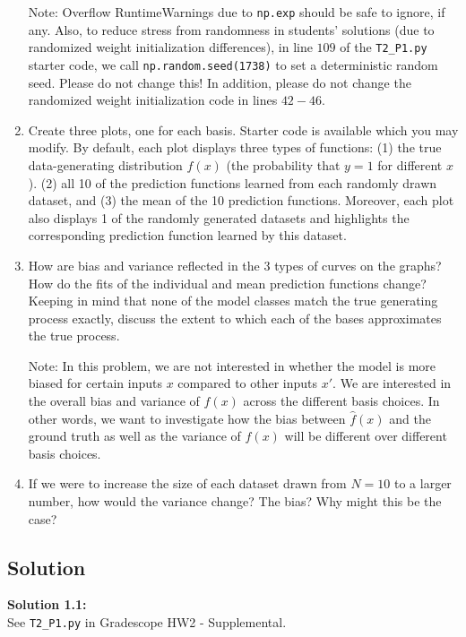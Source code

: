 \documentclass[submit]{harvardml}
\begin{document}
\begin{problem}
\begin{enumerate}
   Note: Overflow RuntimeWarnings due to \verb|np.exp| should be safe to ignore, if any. Also, to reduce stress from randomness in students' solutions (due to randomized weight initialization differences), in line $109$ of the \verb|T2_P1.py| starter code, we call \verb|np.random.seed(1738)| to set a deterministic random seed. Please do not change this! In addition, please do not change the randomized weight initialization code in lines $42-46$.

\item Create three plots, one for each basis. Starter code is available which you may modify.
By default, each plot displays three types of functions:
(1) the true data-generating distribution $f(x)$ (the probability that $y=1$ for different $x$).
(2) all 10 of the prediction functions learned from each randomly drawn dataset, and
(3) the mean of the 10 prediction functions.
Moreover, each plot also displays 1 of the randomly generated datasets and highlights the corresponding prediction function learned by this dataset.

\item How are bias and variance reflected in the 3 types of curves on
  the graphs?  How do the fits of the individual and mean prediction
  functions change?  Keeping in mind that none of the model classes
  match the true generating process exactly, discuss the extent to
  which each of the bases approximates the true process.

  Note: In this problem, we are not interested in whether the model is
  more biased for certain inputs $x$ compared to other inputs $x'$.
  We are interested in the overall bias and variance of $\hat{f}(x)$
  across the different basis choices. In other words, we want to investigate how the bias between $\hat{f}(x)$ and the ground truth as well as the variance of $\hat{f}(x)$ will be different over different basis choices. 

\item If we were to increase the size of each dataset drawn from $N = 10$ to a larger number, how would the variance change? The bias?   Why might this be the case?

\end{enumerate}

\end{problem}

\newpage

\subsection*{Solution}
\noindent\textbf{Solution 1.1:}\\
See \verb|T2_P1.py| in Gradescope HW2 - Supplemental.\\
\end{document}
